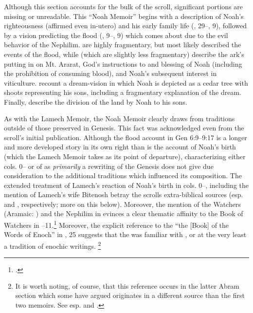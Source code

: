 Although this section accounts for the bulk of the scroll, significant portions are missing or unreadable. This ``Noah Memoir'' begins with a description of Noah's righteousness\autocite{vanderkam_collins-nickelsburg1980} (affirmed even in-utero) and his early family life (, 29--, 9), followed by a vision predicting the flood (, 9--, 9) which comes about due to the evil behavior of the Nephilim.  are highly fragmentary, but most likely described the events of the flood, while  (which are slightly less fragmentary) describe the ark's putting in on Mt. Ararat, God's instructions to  and blessing of Noah (including the prohibition of consuming blood), and Noah's subsequent interest in viticulture.  recount a dream-vision in which Noah is depicted as a cedar tree with shoots representing his sons, including a fragmentary explanation of the dream. Finally,  describe the division of the land by Noah to his sons.

As with the Lamech Memoir, the Noah Memoir clearly draws from traditions outside of those preserved in Genesis. This fact was acknowledged even from the scroll's initial publication.\autocite[38]{avigad-yadin1956} Although the flood account in Gen 6:9--9:17 is a longer and more developed story in its own right than is the account of Noah's birth (which the Lamech Memoir takes as its point of departure), characterizing either cols. 0-- or  of \ga as \emph{primarily} a rewriting of the Genesis does not give due consideration to the additional traditions which influenced its composition. The extended treatment of Lamech's reaction of Noah's birth in cols. 0--, including the mention of Lamech's wife Bitenosh betray the scrolls extra-biblical sources (esp. \firstenoch and \jub, respectively; more on this below). Moreover, the mention of the Watchers (Aramaic: ) and the Nephilim in  evinces a clear thematic affinity to the Book of Watchers in --11.\footnote{\cite[174]{nickelsburg2005}.} Moreover, the explicit reference to the ``the [Book] of the Words of Enoch'' in , 25 suggests that the \ga was familiar with \firstenoch, or at the very least a tradition of enochic writings.%
%
\footnote{It is worth noting, of course, that this reference occurs in the latter Abram section which some have argued originates in a different source than the first two memoirs. See esp. \cite{bernstein_berthelot-etal2010} and \cite{bernstein_as2010}.}

